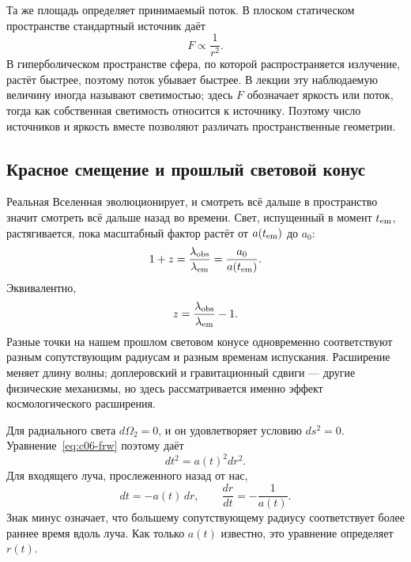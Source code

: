 Та же площадь определяет принимаемый поток. В плоском статическом пространстве стандартный источник даёт
\begin{equation}
F\propto\frac{1}{r^2}.
\end{equation}
В гиперболическом пространстве сфера, по которой распространяется излучение, растёт быстрее, поэтому поток убывает быстрее. В лекции эту наблюдаемую величину иногда называют светимостью; здесь \(F\) обозначает яркость или поток, тогда как собственная светимость относится к источнику. Поэтому число источников и яркость вместе позволяют различать пространственные геометрии.

\subsection{Красное смещение и прошлый световой конус}

Реальная Вселенная эволюционирует, и смотреть всё дальше в пространство значит смотреть всё дальше назад во времени. Свет, испущенный в момент \(t_{\rm em}\), растягивается, пока масштабный фактор растёт от \(a(t_{\rm em})\) до \(a_0\):
\begin{equation}
1+z
=\frac{\lambda_{\rm obs}}{\lambda_{\rm em}}
=\frac{a_0}{a(t_{\rm em})}.
\label{eq:c06-redshift}
\end{equation}
Эквивалентно,
\begin{equation}
z=\frac{\lambda_{\rm obs}}{\lambda_{\rm em}}-1.
\end{equation}
Разные точки на нашем прошлом световом конусе одновременно соответствуют разным сопутствующим радиусам и разным временам испускания. Расширение меняет длину волны; доплеровский и гравитационный сдвиги — другие физические механизмы, но здесь рассматривается именно эффект космологического расширения.

\begin{classroomqa}
\end{classroomqa}

Для радиального света \(d\Omega_2=0\), и он удовлетворяет условию \(ds^2=0\). Уравнение~\eqref{eq:c06-frw} поэтому даёт
\begin{equation}
dt^2=a(t)^2dr^2.
\end{equation}
Для входящего луча, прослеженного назад от нас,
\begin{equation}
dt=-a(t)\,dr,
\qquad
\frac{dr}{dt}=-\frac{1}{a(t)}.
\label{eq:c06-null-ray}
\end{equation}
Знак минус означает, что большему сопутствующему радиусу соответствует более раннее время вдоль луча. Как только \(a(t)\) известно, это уравнение определяет \(r(t)\).

